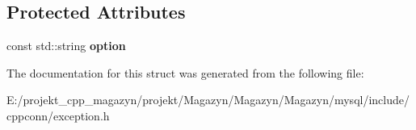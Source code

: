 \subsection*{Protected Attributes}
\begin{DoxyCompactItemize}
\item 
\hypertarget{structsql_1_1_s_q_l_unsupported_option_exception_a8a1789a364522449f67839c018a0bcc6}{}\label{structsql_1_1_s_q_l_unsupported_option_exception_a8a1789a364522449f67839c018a0bcc6} 
const std\+::string {\bfseries option}
\end{DoxyCompactItemize}


The documentation for this struct was generated from the following file\+:\begin{DoxyCompactItemize}
\item 
E\+:/projekt\+\_\+cpp\+\_\+magazyn/projekt/\+Magazyn/\+Magazyn/\+Magazyn/mysql/include/cppconn/exception.\+h\end{DoxyCompactItemize}
